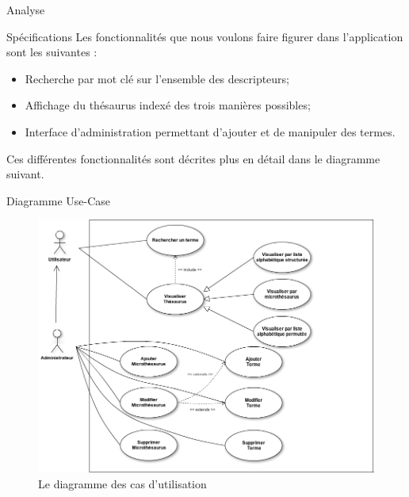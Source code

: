 \documentclass[a4paper, 12pt]{report}
\begin{document}
\begin{chapter}{Analyse}
	\begin{section}{Spécifications}
		Les fonctionnalités que nous voulons faire figurer dans l'application sont les suivantes :
		\begin{itemize}
			\item Recherche par mot clé sur l'ensemble des descripteurs;
			\item Affichage du thésaurus indexé des trois manières possibles;
			\item Interface d'administration permettant d'ajouter et de manipuler des termes.
		\end{itemize}
		
		Ces différentes fonctionnalités sont décrites plus en détail dans le diagramme suivant.
	\end{section}
	\begin{section}{Diagramme Use-Case}\label{re}
		\begin{figure}[h]
			\label{sucresale}
			\begin{center}
				\includegraphics[width=15cm]{Use-Case.png}
				\caption{Le diagramme des cas d'utilisation}
			\end{center}
		\end{figure}~\\
		

\end{section}
\end{chapter}
\end{document}
